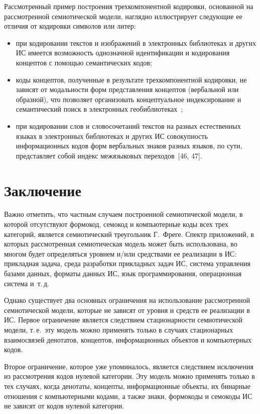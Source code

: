 \begin{multicols}{2}
   Рассмотренный пример построения трехкомпонентной кодировки, основанной на 
рассмотренной семиотической модели, наглядно иллюстрирует следующие ее отличия от 
кодировки символов или литер:
   \begin{itemize}
\item при кодировании текстов и изображений в электронных библиотеках и 
других ИС имеется возможность однозначной идентификации и кодирования 
концептов с помощью семантических кодов;
\item коды концептов, полученные в результате трехкомпонентной кодировки, не 
зависят от модальности форм представления концептов (вербальной или 
образной), что позволяет\linebreak
 организовать концептуальное индексирование и 
семантический поиск в электронных гео\-биб\-лио\-те\-ках~\cite{38zat};
\item при кодировании слов и словосочетаний текс\-тов на разных естественных 
языках в электронных библиотеках и других ИС совокупность информационных 
кодов форм вербальных знаков разных языков, по сути, представляет собой индекс 
межязыковых переходов~[46, 47].
\end{itemize}

\section{Заключение}

   Важно отметить, что частным случаем построенной семиотической модели, в которой 
отсутствуют формокод, семокод и компьютерные коды всех трех категорий, является 
семиотический треугольник Г.~Фреге. Спектр приложений, в которых рассмотренная 
семиотическая модель может быть использована, во многом будет определяться уровнем 
и/или средствами ее реализации в ИС: прикладная задача, среда разработки прикладных 
задач ИС, сис\-те\-ма управления базами данных, форматы данных ИС, язык 
программирования, операционная система и~т.\,д.
   
   Однако существует два основных ограничения на использование рассмотренной 
семиотической модели, которые не зависят от уровня и средств ее реализации в ИС. Первое 
ограничение является следствием стационарности семиотической модели, т.\,е.\ эту модель 
можно применять только в случаях стационарных взаимосвязей денотатов, концептов, 
информационных объектов и компьютерных кодов.
   
   Второе ограничение, которое уже упоминалось, является следствием исключения из 
рассмотрения кодов нулевой категории. Эту модель можно применять только в тех случаях, 
когда денотаты, концепты, информационные объекты, их бинарные отношения с 
компьютерными кодами, а также знаки, формокоды и семокоды ИС не зависят от кодов 
нулевой категории.
   

\end{multicols}
